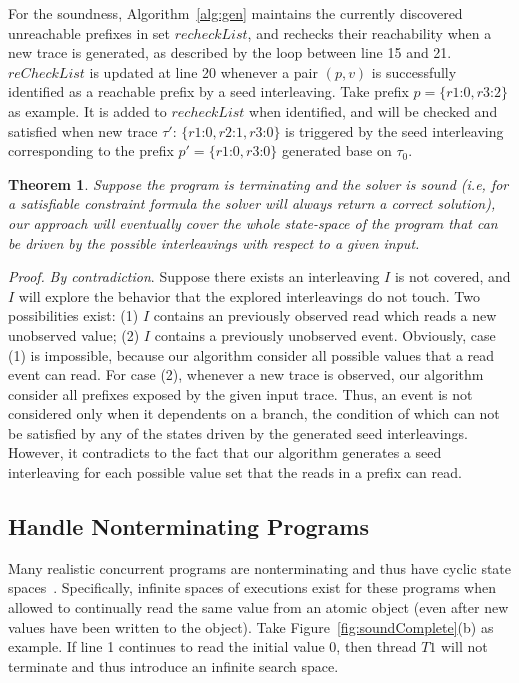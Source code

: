 \documentclass[preprint, numbers, 10pt]{sigplanconf}
\newtheorem{theorem}{Theorem}
\begin{document}
For the soundness, Algorithm~\ref{alg:gen} maintains the currently discovered unreachable prefixes in set $recheckList$,
and rechecks their reachability when a new trace is generated, as described by the loop between line 15 and 21.
$reCheckList$ is updated at line 20 whenever a pair $(p,v)$ is successfully identified as a reachable prefix by a seed interleaving.
Take prefix $p=\{r1$:$0,r3$:$2\}$ as example. It is added to $recheckList$ when identified, and will be checked and satisfied
when new trace $\tau'$: $\{r1$:$0,r2$:$1,r3$:$0\}$ is triggered by the seed interleaving 
corresponding to the prefix $p'=\{r1$:$0,r3$:$0\}$ generated base on $\tau_0$.

\begin{theorem}
Suppose the program is terminating and the solver is sound (i.e, for a satisfiable constraint formula
 the solver will always return a correct solution), our approach will eventually cover the whole state-space
of the program that can be driven by the possible interleavings with respect to a given input.
\end{theorem}

\textit{Proof.} \textit{By contradiction}. Suppose there exists an interleaving $I$ is not covered, and 
$I$ will explore the behavior that the explored interleavings do not touch.
Two possibilities exist: (1) $I$ contains an previously observed read which reads a new unobserved value;
(2) $I$ contains a previously unobserved event. 
Obviously, case (1) is impossible, because our algorithm consider all possible values that a read event can read.
For case (2), whenever a new trace is observed, our algorithm consider all prefixes exposed by the given input trace. 
Thus, an event is not considered only when it dependents on a branch, the condition of which can not be satisfied by any 
of the states driven by the generated seed interleavings. However, it contradicts to the fact that our algorithm
generates a seed interleaving for each possible value set that the reads in a prefix can read.

\subsection{Handle Nonterminating Programs}

Many realistic concurrent programs are nonterminating and thus have cyclic state spaces~\cite{Musuvathi:2008}.
Specifically, infinite spaces of executions exist for these programs when allowed to continually read 
the same value from an atomic object (even after new values have been written to the
object). Take Figure~\ref{fig:soundComplete}(b) as example. If line 1 continues to read the initial value $0$, 
then thread $T1$ will not terminate and thus introduce an infinite search space. 
\end{document}
